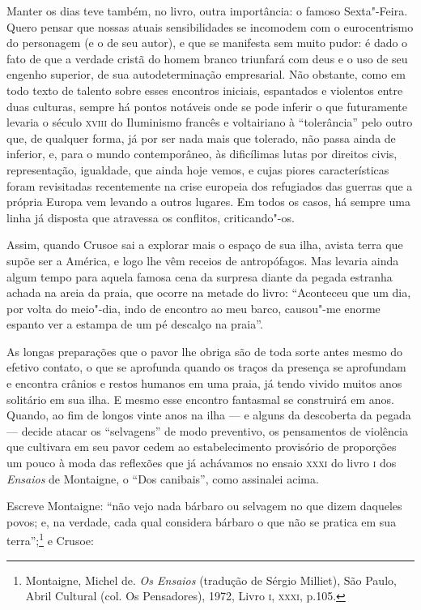 Manter os dias teve também, no livro, outra importância: o famoso
Sexta"-Feira. Quero pensar que nossas atuais sensibilidades se incomodem
com o eurocentrismo do personagem (e o de seu autor), e que se manifesta
sem muito pudor: é dado o fato de que a verdade cristã do homem branco
triunfará com deus e o uso de seu engenho superior, de sua
autodeterminação empresarial. Não obstante, como em todo texto de
talento sobre esses encontros iniciais, espantados e violentos entre
duas culturas, sempre há pontos notáveis onde se pode inferir o que
futuramente levaria o século \textsc{xviii} do Iluminismo francês e voltairiano à
``tolerância'' pelo outro que, de qualquer forma, já por ser nada mais
que tolerado, não passa ainda de inferior, e, para o mundo
contemporâneo, às dificílimas lutas por direitos civis, representação,
igualdade, que ainda hoje vemos, e cujas piores características foram
revisitadas recentemente na crise europeia dos refugiados das guerras
que a própria Europa vem levando a outros lugares. Em todos os casos, há
sempre uma linha já disposta que atravessa os conflitos, criticando"-os.

Assim, quando Crusoe sai a explorar mais o espaço de sua ilha, avista
terra que supõe ser a América, e logo lhe vêm receios de antropófagos.
Mas levaria ainda algum tempo para aquela famosa cena da surpresa diante
da pegada estranha achada na areia da praia, que ocorre na metade do
livro: ``Aconteceu que um dia, por volta do meio"-dia, indo de encontro
ao meu barco, causou"-me enorme espanto ver a estampa de um pé descalço
na praia''.

As longas preparações que o pavor lhe obriga são de toda sorte antes
mesmo do efetivo contato, o que se aprofunda quando os traços da
presença se aprofundam e encontra crânios e restos humanos em uma praia,
já tendo vivido muitos anos solitário em sua ilha. E mesmo esse encontro
fantasmal se construirá em anos. Quando, ao fim de longos vinte anos na
ilha --- e alguns da descoberta da pegada --- decide atacar os
``selvagens'' de modo preventivo, os pensamentos de violência que
cultivara em seu pavor cedem ao estabelecimento provisório de proporções
um pouco à moda das reflexões que já achávamos no ensaio \textsc{xxxi} do livro \textsc{i}
dos \emph{Ensaios} de Montaigne, o ``Dos canibais'', como assinalei
acima.

Escreve Montaigne: ``não vejo nada bárbaro ou selvagem no que dizem
daqueles povos; e, na verdade, cada qual considera bárbaro o que não se
pratica em sua terra'';\footnote{Montaigne, Michel de. \emph{Os Ensaios}
  (tradução de Sérgio Milliet), São Paulo, Abril Cultural (col. Os
  Pensadores), 1972, Livro \textsc{i}, \textsc{xxxi}, p.105.} e Crusoe:

